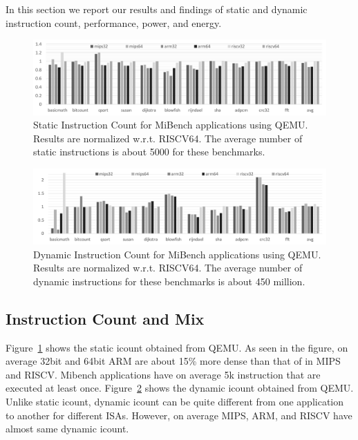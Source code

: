 
\label{sec:expt}

In this section we report our results and findings of static and dynamic instruction count, performance, power, and energy. 

\begin{figure}[htb]
	\centering
	\includegraphics[width=1.9\columnwidth]{figures/static.pdf}
	\caption{Static Instruction Count for MiBench applications using QEMU. Results are normalized w.r.t. RISCV64. The average number of static instructions is about 5000 for these benchmarks.}
	\label{fig:static}
\end{figure} 


\begin{figure}[htb]
	\centering
	\includegraphics[width=1.9\columnwidth]{figures/dynamic.pdf}
	\caption{Dynamic Instruction Count for MiBench applications using QEMU. Results are normalized w.r.t. RISCV64. The average number of dynamic instructions for these benchmarks is about 450 million.}
	\label{fig:dynamic}
	\vspace{-1em}
\end{figure} 


\subsection{Instruction Count and Mix}
Figure~\ref{fig:static} shows the static icount obtained from QEMU. As seen in the figure, on average 32bit and 64bit ARM are about 15\% more dense than that of in MIPS and RISCV. Mibench applications have on average 5k instruction that are executed at least once. Figure~\ref{fig:dynamic} shows the dynamic icount obtained from QEMU. Unlike static icount, dynamic icount can be quite different from one application to another for different ISAs. However, on average MIPS, ARM, and RISCV have almost same dynamic icount. 



